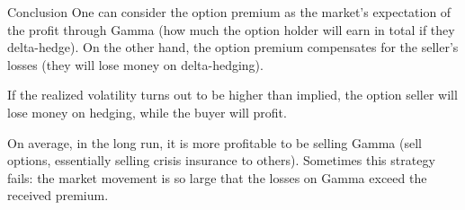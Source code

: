 \documentclass{beamer}
\begin{document}
\begin{frame}{Conclusion}
\justify
One can consider the option premium as the market's expectation of the profit through Gamma (how much the option holder will earn in total if they delta-hedge). On the other hand, the option premium compensates for the seller's losses (they will lose money on delta-hedging).

\justify
If the realized volatility turns out to be higher than implied, the option seller will lose money on hedging, while the buyer will profit.

\justify
On average, in the long run, it is more profitable to be selling Gamma (sell options, essentially selling crisis insurance to others). Sometimes this strategy fails: the market movement is so large that the losses on Gamma exceed the received premium.
\end{frame}
\end{document}
